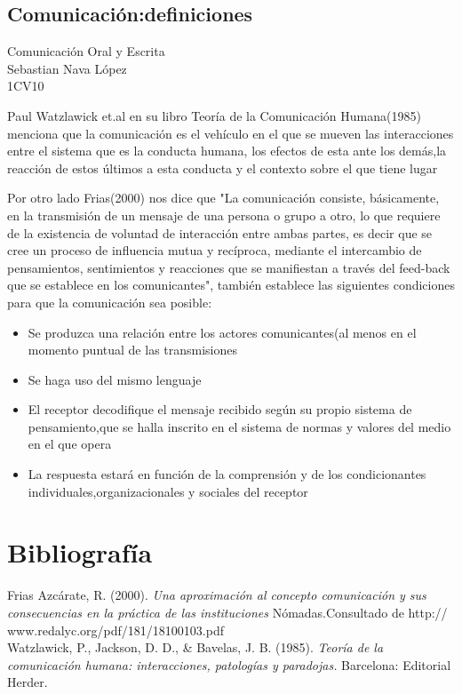 \documentclass[a4paper,12pt]{article}
\begin{document}
\begin{center}
\section*{Comunicación:definiciones}
{\large Comunicación Oral y Escrita}\\
Sebastian Nava López\\
1CV10\\[2ex]
\end{center}
Paul Watzlawick et.al en su libro Teoría de la Comunicación Humana(1985) menciona que la comunicación es el vehículo en el que se mueven las interacciones entre el sistema que es la conducta humana, los efectos de esta ante los demás,la reacción de estos últimos a esta conducta y el contexto sobre el que tiene lugar

Por otro lado Frias(2000) nos dice que "La comunicación consiste, básicamente, en la transmisión de un mensaje de una persona o grupo a otro, lo que requiere de la existencia de voluntad de interacción entre ambas partes, es decir que se cree un proceso de influencia mutua y recíproca, mediante el intercambio de pensamientos, sentimientos y reacciones que se manifiestan a través del feed-back que se establece en los comunicantes", también establece las siguientes condiciones para que la comunicación sea posible:
\begin{itemize}
\item{Se produzca una relación entre los actores comunicantes(al menos en el momento puntual de las transmisiones}
\item{Se haga uso del mismo lenguaje}
\item{El receptor decodifique el mensaje recibido según su propio sistema de pensamiento,que se halla inscrito en el sistema de normas y valores del medio en el que opera}
\item{La respuesta estará en función de la comprensión y de los condicionantes individuales,organizacionales y sociales del receptor}
\end{itemize}
\section*{Bibliografía}
Frias Azcárate, R. (2000). \textit{Una aproximación al concepto comunicación y sus consecuencias en la práctica de las instituciones} Nómadas.Consultado de http:// www.redalyc.org/pdf/181/18100103.pdf\\
Watzlawick, P., Jackson, D. D., \& Bavelas, J. B. (1985). \textit{Teoría de la comunicación humana: interacciones, patologías y paradojas.} Barcelona: Editorial Herder. 
\end{document}
